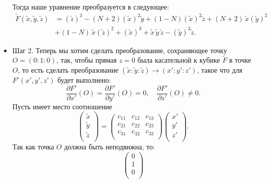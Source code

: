 \begin{itemize}[leftmargin=0.6cm]
    Тогда наше уравнение преобразуется в следующее:  
    \begin{align*}
        \widetilde{F}(\widetilde{x}, \widetilde{y}, \widetilde{z}) &= 
     \left(\widetilde{z}\right)^3
     -(N + 2) \left(\widetilde{x}\right)^2 \widetilde{y} + (1 - N)
     \left(\widetilde{x}\right)^2 \widetilde{z} + (N + 2) \,
     \widetilde{x} \left(\widetilde{y}\right)^2 \\ 
     &+ (1 - N) \, \widetilde{x} \left(\widetilde{z}\right)^2 + 
     \left(\widetilde{x}\right)^3 + \widetilde{x} \,
     \widetilde{y} \, \widetilde{z} -
     \left(\widetilde{y}\right)^2 \widetilde{z}
    .\end{align*}
    

    \item Шаг 2. Теперь мы хотим сделать преобразование,
    сохраняющее точку \(O = (0 : 1 : 0)\), так, чтобы
    прямая \(z = 0\) была касательной к кубике \(\widetilde{F}\) в точке
    \(O\), то есть сделать преобразование \((\widetilde{x} :
    \widetilde{y} : \widetilde{z}) \to (x' : y' : z')\), такое что
    для \(F'(x', y', z')\) будет выполнено: 
     \[
    \frac{\partial F'}{\partial x'} (O) = \frac{\partial F'}{\partial y'}
    (O) = 0, \quad \frac{\partial F'}{\partial z'} (O) \ne 0
    .\]
    Пусть имеет место соотношение
    \[
    \begin{pmatrix}
        \widetilde{x} \\
        \widetilde{y} \\
        \widetilde{z} \\
    \end{pmatrix} 
    = 
    \begin{pmatrix}
        c_{11} & c_{12} & c_{13} \\
        c_{21} & c_{22} & c_{23} \\
        c_{31} & c_{32} & c_{33} \\
    \end{pmatrix}
    \begin{pmatrix}
        x' \\
        y' \\
        z' \\
    \end{pmatrix}
    .\] 
    Так как точка \(O\) должна быть неподвижна, то:
    \[
    \begin{pmatrix}
        0 \\
        1 \\
        0 \\
    \end{pmatrix}
\]
\end{itemize}
